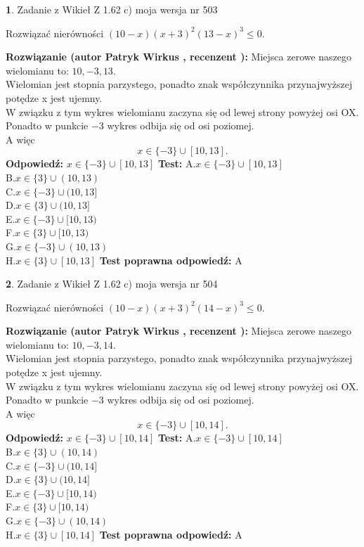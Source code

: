 \documentclass[12pt, a4paper]{article}
\theoremstyle{definition} %
\newtheorem{zad}{}
\newcommand{\zadStart}[1]{\begin{zad}#1\newline}
\newcommand{\zadStop}{\end{zad}}
\newcommand{\rozwStart}[2]{\noindent \textbf{Rozwiązanie (autor #1 , recenzent #2): }\newline}
\newcommand{\rozwStop}{\newline}
\newcommand{\odpStart}{\noindent \textbf{Odpowiedź:}\newline}
\newcommand{\odpStop}{\newline}
\newcommand{\testStart}{\noindent \textbf{Test:}\newline}
\newcommand{\testStop}{\newline}
\newcommand{\kluczStart}{\noindent \textbf{Test poprawna odpowiedź:}\newline}
\newcommand{\kluczStop}{\newline}
\begin{document}
\zadStart{Zadanie z Wikieł Z 1.62 c) moja wersja nr 503}

Rozwiązać nierówności $(10-x)(x+3)^{2}(13-x)^{3}\le0$.
\zadStop
\rozwStart{Patryk Wirkus}{}
Miejsca zerowe naszego wielomianu to: $10, -3, 13$.\\
Wielomian jest stopnia parzystego, ponadto znak współczynnika przy\linebreak najwyższej potędze x jest ujemny.\\ W związku z tym wykres wielomianu zaczyna się od lewej strony powyżej osi OX.\\
Ponadto w punkcie $-3$ wykres odbija się od osi poziomej.\\
A więc $$x \in \{-3\} \cup [10,13].$$
\rozwStop
\odpStart
$x \in \{-3\} \cup [10,13]$
\odpStop
\testStart
A.$x \in \{-3\} \cup [10,13]$\\
B.$x \in \{3\} \cup (10,13)$\\
C.$x \in \{-3\} \cup (10,13]$\\
D.$x \in \{3\} \cup (10,13]$\\
E.$x \in \{-3\} \cup [10,13)$\\
F.$x \in \{3\} \cup [10,13)$\\
G.$x \in \{-3\} \cup (10,13)$\\
H.$x \in \{3\} \cup [10,13]$
\testStop
\kluczStart
A
\kluczStop



\zadStart{Zadanie z Wikieł Z 1.62 c) moja wersja nr 504}

Rozwiązać nierówności $(10-x)(x+3)^{2}(14-x)^{3}\le0$.
\zadStop
\rozwStart{Patryk Wirkus}{}
Miejsca zerowe naszego wielomianu to: $10, -3, 14$.\\
Wielomian jest stopnia parzystego, ponadto znak współczynnika przy\linebreak najwyższej potędze x jest ujemny.\\ W związku z tym wykres wielomianu zaczyna się od lewej strony powyżej osi OX.\\
Ponadto w punkcie $-3$ wykres odbija się od osi poziomej.\\
A więc $$x \in \{-3\} \cup [10,14].$$
\rozwStop
\odpStart
$x \in \{-3\} \cup [10,14]$
\odpStop
\testStart
A.$x \in \{-3\} \cup [10,14]$\\
B.$x \in \{3\} \cup (10,14)$\\
C.$x \in \{-3\} \cup (10,14]$\\
D.$x \in \{3\} \cup (10,14]$\\
E.$x \in \{-3\} \cup [10,14)$\\
F.$x \in \{3\} \cup [10,14)$\\
G.$x \in \{-3\} \cup (10,14)$\\
H.$x \in \{3\} \cup [10,14]$
\testStop
\kluczStart
A
\kluczStop
\end{document}
